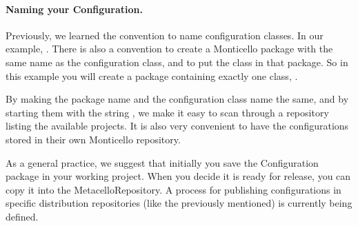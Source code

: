 \documentclass[a4paper,10pt,twoside]{book}
\begin{document}
\paragraph{Naming your Configuration.}

Previously, we learned the convention to name configuration classes. In our example, . There is also a convention to create a Monticello package with the same name as the configuration class, and to put the class in that package. So in this example you will create a package  containing exactly one class, . 

By making the package name and the configuration class name the same, and by starting them with the string ,  we make it easy to scan through a repository listing the available projects. It is also very convenient to have the configurations stored in their own Monticello repository. 


As a general practice, we suggest that initially you save the Configuration package in your working project. When you decide it is ready for release, you can copy it into the MetacelloRepository. A process for publishing configurations in specific distribution repositories (like the previously mentioned) is currently being defined.
\end{document}
